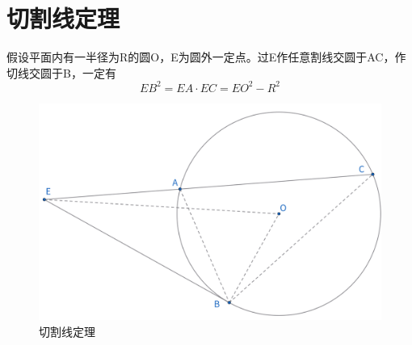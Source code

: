 \section{切割线定理}
\begin{theorem}[切割线定理]
    假设平面内有一半径为R的圆O，E为圆外一定点。过E作任意割线交圆于AC，作切线交圆于B，一定有
    $$
    EB^2 = EA \cdot EC = EO^2 - R^2
    $$
\end{theorem}
\begin{figure}[H]
    \centering
    \includegraphics[width=0.7\linewidth]{figures/切割弦定理.png}
    \caption{切割线定理}
\end{figure}


